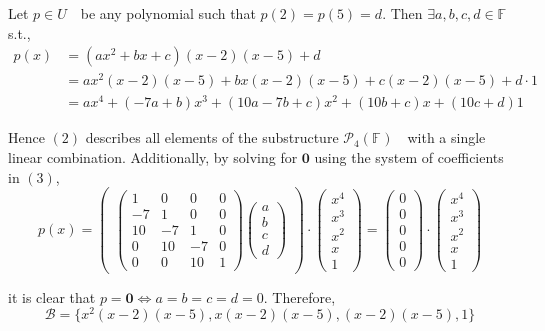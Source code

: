 \documentclass[
	12pt, %
]{fphw}
\newcommand\0{\mathbf{0}}
\newcommand\set[1]{\{#1\}}
\newcommand\F[1]{\text{$\mathbb{F}^{#1}$}}
\newcommand\U{\text{$U$ }}
\newcommand\poly[1]{\text{$\mathcal{P}_{#1}(\F{})$ }}
\begin{document}
Let $p \in \U{}$ be any polynomial such that $p(2) = p(5) = d$. Then $\exists a,b,c,d \in \F{}$ s.t.,
\begin{align}
p(x) &= (ax^2+bx + c)(x-2)(x-5) + d\\
&=ax^2(x-2)(x-5) + bx(x-2)(x-5) + c(x-2)(x-5) + d\cdot1\\
&=ax^4 + (-7a+b)x^3 +(10a-7b+c)x^2 + (10b + c)x + (10c+d)1
\end{align}

Hence $(2)$ describes all elements of the substructure $\poly{4}$ with a single linear combination. Additionally, by solving for $\0$ using the system of coefficients in $(3)$, 
\begin{equation}
p(x)=
\begin{pmatrix}
\begin{pmatrix}
1 & 0 & 0 & 0\\
-7& 1 & 0 & 0\\
10&-7 & 1 & 0\\
0 & 10 & -7 & 0\\
 0 & 0 & 10 & 1
\end{pmatrix}

\begin{pmatrix}
a\\b\\c\\d
\end{pmatrix}
\end{pmatrix}\cdot
\begin{pmatrix}
x^4\\x^3\\x^2\\x\\1
\end{pmatrix}
=
\begin{pmatrix}
0\\0\\0\\0\\0
\end{pmatrix}\cdot
\begin{pmatrix}
x^4\\x^3\\x^2\\x\\1
\end{pmatrix}
\end{equation}

it is clear that $p = \0 \iff a=b=c=d=0$. Therefore,
$$\mathcal{B}=\set{x^2(x-2)(x-5), x(x-2)(x-5), (x-2)(x-5), 1} $$ 
\end{document}
